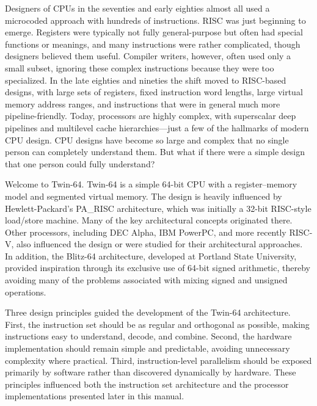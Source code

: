 
Designers of CPUs in the seventies and early eighties almost all used a microcoded approach with hundreds of instructions. RISC was just beginning to emerge. Registers were typically not fully general-purpose but often had special functions or meanings, and many instructions were rather complicated, though designers believed them useful. Compiler writers, however, often used only a small subset, ignoring these complex instructions because they were too specialized. In the late eighties and nineties the shift moved to RISC-based designs, with large sets of registers, fixed instruction word lengths, large virtual memory address ranges, and instructions that were in general much more pipeline-friendly. Today, processors are highly complex, with superscalar deep pipelines and multilevel cache hierarchies—just a few of the hallmarks of modern CPU design. CPU designs have become so large and complex that no single person can completely understand them. But what if there were a simple design that one person could fully understand?


Welcome to Twin-64. Twin-64 is a simple 64-bit CPU with a register–memory model and segmented virtual memory. The design is heavily influenced by Hewlett-Packard’s PA\_RISC architecture, which was initially a 32-bit RISC-style load/store machine. Many of the key architectural concepts originated there. Other processors, including DEC Alpha, IBM PowerPC, and more recently RISC-V, also influenced the design or were studied for their architectural approaches. In addition, the Blitz-64 architecture, developed at Portland State University, provided inspiration through its exclusive use of 64-bit signed arithmetic, thereby avoiding many of the problems associated with mixing signed and unsigned operations.

Three design principles guided the development of the Twin-64 architecture. First, the instruction set should be as regular and orthogonal as possible, making instructions easy to understand, decode, and combine. Second, the hardware implementation should remain simple and predictable, avoiding unnecessary complexity where practical. Third, instruction-level parallelism should be exposed primarily by software rather than discovered dynamically by hardware. These principles influenced both the instruction set architecture and the processor implementations presented later in this manual.

